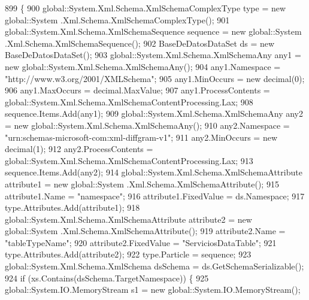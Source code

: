 \begin{DoxyCode}
899                                                                                                            
                               \{
900                 global::System.Xml.Schema.XmlSchemaComplexType type = \textcolor{keyword}{new} global::System
      .Xml.Schema.XmlSchemaComplexType();
901                 global::System.Xml.Schema.XmlSchemaSequence sequence = \textcolor{keyword}{new} global::System
      .Xml.Schema.XmlSchemaSequence();
902                 BaseDeDatosDataSet ds = \textcolor{keyword}{new} BaseDeDatosDataSet();
903                 global::System.Xml.Schema.XmlSchemaAny any1 = \textcolor{keyword}{new} global::System.Xml.Schema.XmlSchemaAny();
904                 any1.Namespace = \textcolor{stringliteral}{"http://www.w3.org/2001/XMLSchema"};
905                 any1.MinOccurs = \textcolor{keyword}{new} decimal(0);
906                 any1.MaxOccurs = decimal.MaxValue;
907                 any1.ProcessContents = global::System.Xml.Schema.XmlSchemaContentProcessing.Lax;
908                 sequence.Items.Add(any1);
909                 global::System.Xml.Schema.XmlSchemaAny any2 = \textcolor{keyword}{new} global::System.Xml.Schema.XmlSchemaAny();
910                 any2.Namespace = \textcolor{stringliteral}{"urn:schemas-microsoft-com:xml-diffgram-v1"};
911                 any2.MinOccurs = \textcolor{keyword}{new} decimal(1);
912                 any2.ProcessContents = global::System.Xml.Schema.XmlSchemaContentProcessing.Lax;
913                 sequence.Items.Add(any2);
914                 global::System.Xml.Schema.XmlSchemaAttribute attribute1 = \textcolor{keyword}{new} global::System
      .Xml.Schema.XmlSchemaAttribute();
915                 attribute1.Name = \textcolor{stringliteral}{"namespace"};
916                 attribute1.FixedValue = ds.Namespace;
917                 type.Attributes.Add(attribute1);
918                 global::System.Xml.Schema.XmlSchemaAttribute attribute2 = \textcolor{keyword}{new} global::System
      .Xml.Schema.XmlSchemaAttribute();
919                 attribute2.Name = \textcolor{stringliteral}{"tableTypeName"};
920                 attribute2.FixedValue = \textcolor{stringliteral}{"ServiciosDataTable"};
921                 type.Attributes.Add(attribute2);
922                 type.Particle = sequence;
923                 global::System.Xml.Schema.XmlSchema dsSchema = ds.GetSchemaSerializable();
924                 \textcolor{keywordflow}{if} (xs.Contains(dsSchema.TargetNamespace)) \{
925                     global::System.IO.MemoryStream s1 = \textcolor{keyword}{new} global::System.IO.MemoryStream();

\end{DoxyCode}
